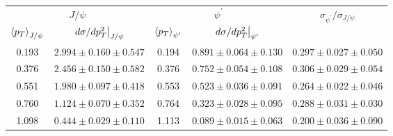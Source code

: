 \begin{tabular}{cc|cc|c}
\hline
\multicolumn{2}{c|}{$J/\psi$} &
  \multicolumn{2}{c|}{$\psi^{\prime}$} &
  \multirow{2}{*}{$\sigma_{\psi^\prime}/\sigma_{J/\psi}$} \\ \cline{1-4}
$\expval{p_T}_{J/\psi}$ &
  $\eval{d\sigma/dp^2_T}_{J/\psi}$ &
  $\expval{p_T}_{\psi^\prime}$ &
  $\eval{d\sigma/dp^2_T}_{\psi^\prime}$ &
   \\ \hline
0.193 & $2.994\pm0.160\pm0.547$ & 0.194 & $0.891\pm0.064\pm0.130$ & $0.297\pm0.027\pm0.050$ \\
0.376 & $2.456\pm0.150\pm0.582$ & 0.376 & $0.752\pm0.054\pm0.108$ & $0.306\pm0.029\pm0.054$ \\
0.551 & $1.980\pm0.097\pm0.418$ & 0.553 & $0.523\pm0.036\pm0.091$ & $0.264\pm0.022\pm0.046$ \\
0.760 & $1.124\pm0.070\pm0.352$ & 0.764 & $0.323\pm0.028\pm0.095$ & $0.288\pm0.031\pm0.030$ \\
1.098 & $0.444\pm0.029\pm0.110$ & 1.113 & $0.089\pm0.015\pm0.063$ & $0.200\pm0.036\pm0.090$ \\ \hline
\end{tabular}
